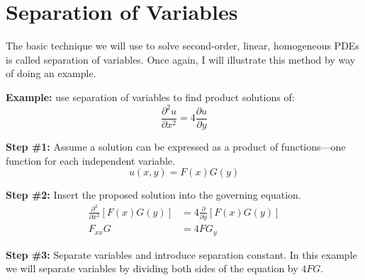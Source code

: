 \section{Separation of Variables}
The basic technique we will use to solve second-order, linear, homogeneous PDEs is called separation of variables.  Once again, I will illustrate this method by way of doing an example.

\vspace{0.25cm}

\noindent\textbf{Example:} use separation of variables to find product solutions of:
\begin{equation}
\frac{\partial^2 u}{\partial x^2} = 4\frac{\partial u}{\partial y}
\label{eq:lec21-ex}
\end{equation}

\noindent\textbf{Step \#1:} Assume a solution can be expressed as a product of functions---one function for each independent variable.  
\begin{equation*}
u(x,y) = F(x)G(y)
\end{equation*}

\vspace{0.5cm}

\noindent\textbf{Step \#2:} Insert the proposed solution into the governing equation.
\begin{align*}
\frac{\partial^2}{\partial x^2}\left[F(x)G(y)\right] &= 4 \frac{\partial}{\partial y}\left[F(x)G(y)\right] \\
F_{xx}G &= 4 FG_{y}
\end{align*}

\vspace{0.5cm}

\noindent\textbf{Step \#3:} Separate variables and introduce separation constant.  In this example we will separate variables by dividing both sides of the equation by $4FG$.

